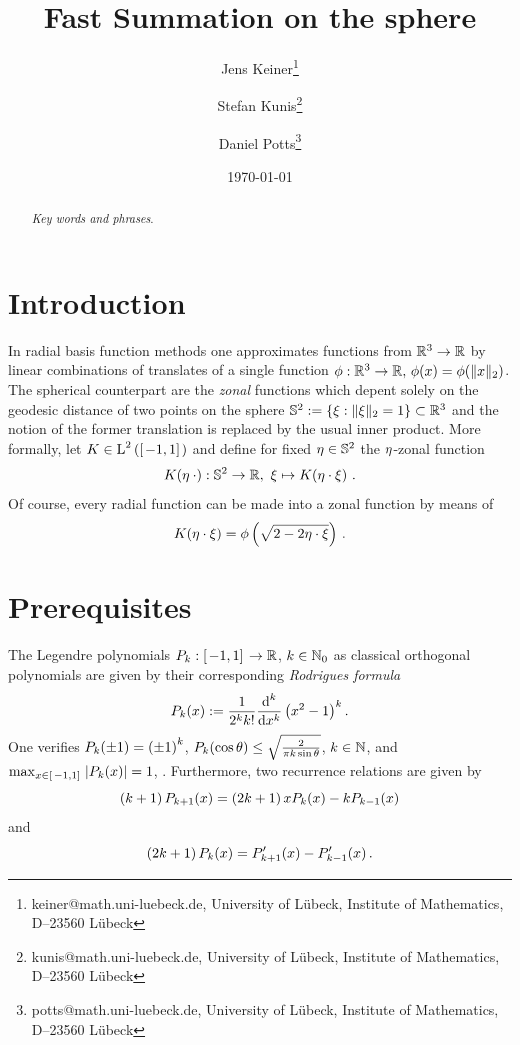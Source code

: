 \documentclass[11pt,a4paper,twoside,bibtotoc]{scrartcl}
\title{
Fast Summation on the sphere}
\date{\today}
\author{
Jens Keiner\thanks{keiner@math.uni-luebeck.de, University of
  L\"ubeck, Institute of Mathematics, D--23560 L\"ubeck} \and
Stefan Kunis\thanks{kunis@math.uni-luebeck.de, University of
  L\"ubeck, Institute of Mathematics, D--23560 L\"ubeck} \and
  Daniel Potts\thanks{potts@math.uni-luebeck.de, University of
  L\"ubeck, Institute of Mathematics, D--23560 L\"ubeck} 
}
\theoremstyle{plain}
\theoremstyle{definition}
\theoremstyle{remark}
\numberwithin{equation}{section}
\numberwithin{table}{section}
\numberwithin{figure}{section}
\begin{document}
\maketitle

\begin{abstract}
\medskip


\noindent
{\it Key words and phrases}.  
\end{abstract}

\section{Introduction}
\label{sect:1}
In radial basis function methods one approximates functions from $\mathbb{R}^3
\rightarrow \mathbb{R}$ by linear combinations of translates of a single function
$\phi:\mathbb{R}^3 \rightarrow \mathbb{R}, \, \phi(x)=\phi(\|x\|_2)$.
The spherical counterpart are the \emph{zonal} functions which depent solely
on the geodesic distance of two points on the sphere $\mathbb{S}^2:=\{
\mathbf{\xi}: \|\mathbf{\xi}\|_2=1\} \subset \mathbb{R}^3$ and the notion of the former
translation is replaced by the usual inner product.
More formally, let $K \in \text{\rm{L}}^{2}\left(\left[\left.-1,1\right]\right.\right)$ and define for fixed
$\mathbf{\eta} \in \mathbb{S}^2$ the $\mathbf{\eta}$-zonal function 
\[
  \fun{K}{\V{\eta} \: \cdot}: \twosphere \rightarrow \R,\ \V{\xi} \mapsto
  \fun{K}{\V{\eta} \cdot \V{\xi}}\,.%
\]
Of course, every radial function can be made into a zonal function by means of
\[
  K{\hspace{-0.4ex}}\left(\mathbf{\eta} \cdot \mathbf{\xi}\right) = \phi\left(\sqrt{2-2\mathbf{\eta} \cdot
  \mathbf{\xi}}\right)\,.
\]

\section{Prerequisites}
\label{sect:2}
The Legendre polynomials $P_k : \left[\left.-1,1\right]\right. \rightarrow \mathbb{R}$, $k \in
\mathbb{N}_{0}$ as classical orthogonal polynomials are given by their corresponding
\emph{Rodrigues formula}
\[
P_k{\hspace{-0.4ex}}\left(x\right) := \frac{1}{2^k k!} \frac{\text{\rm{d}}^k}{\text{\rm{d}} x^k} \left(x^2-1\right)^k.
\]
One verifies $P_{k}{\hspace{-0.4ex}}\left(\pm1\right) = \left(\pm1\right)^{k}$, $P_{k}{\hspace{-0.4ex}}\left(\cos\theta\right)
\le \sqrt{\frac{2}{\pi k \sin\theta}}$, $k \in \mathbb{N}$, and $\max_{x \in
  \left[\left.-1,1\right]\right.} \left\vert P_{k}{\hspace{-0.4ex}}\left(x\right)\right\vert = 1$, \cite[pp. 447]{niuv}.
Furthermore, two recurrence relations are given by
\begin{equation}\label{three1}
\left(k+1\right)P_{k+1}{\hspace{-0.4ex}}\left(x\right) = \left(2k+1\right)xP_{k}{\hspace{-0.4ex}}\left(x\right) - kP_{k-1}{\hspace{-0.4ex}}\left(x\right)
\end{equation}
and
\begin{equation}\label{three2}
\left(2k+1\right) P_{k}{\hspace{-0.4ex}}\left(x\right) = P_{k+1}'{\hspace{-0.4ex}}\left(x\right) - P_{k-1}'{\hspace{-0.4ex}}\left(x\right).
\end{equation}
\end{document}
